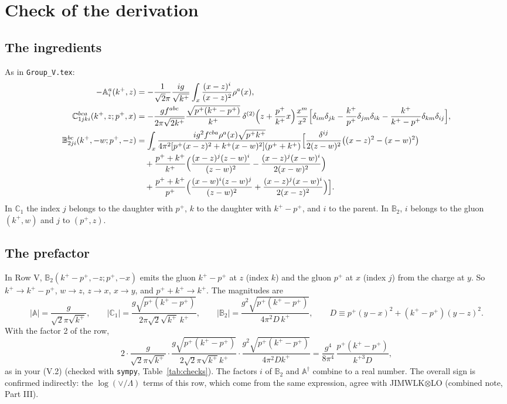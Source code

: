 \documentclass[10pt]{article}
\numberwithin{equation}{section}
\def\mf#1{\mathbb{#1}}
\begin{document}
\section{Check of the derivation}\label{sec:check}
\subsection{The ingredients}
As in \texttt{Group\_V.tex}:
\begin{align}
-\mf A^a_i(k^+,z)&=-\frac{1}{\sqrt2\pi}\frac{ig}{\sqrt{k^+}}\int_x\frac{(x-z)^i}{(x-z)^2}\rho^a(x),\\
\mf C^{bca}_{1jki}(k^+,z;p^+,x)&=-\frac{gf^{abc}}{2\pi\sqrt{2k^+}}\frac{\sqrt{p^+(k^+-p^+)}}{k^+}\,\delta^{(2)}\Big(z+\frac{p^+}{k^+}x\Big)\frac{x^m}{x^2}\Big[\delta_{im}\delta_{jk}-\frac{k^+}{p^+}\delta_{jm}\delta_{ik}-\frac{k^+}{k^+-p^+}\delta_{km}\delta_{ij}\Big],\\
\mf B^{bc}_{2ji}(k^+,-w;p^+,-z)&=\int_x\frac{ig^2f^{cba}\rho^a(x)\sqrt{p^+k^+}}{4\pi^2[p^+(x-z)^2+k^+(x-w)^2](p^++k^+)}\Big[\frac{\delta^{ij}}{2(z-w)^2}\big((x-z)^2-(x-w)^2\big)\notag\\
&\quad+\frac{p^++k^+}{k^+}\Big(\frac{(x-z)^j(z-w)^i}{(z-w)^2}-\frac{(x-z)^j(x-w)^i}{2(x-w)^2}\Big)\notag\\
&\quad+\frac{p^++k^+}{p^+}\Big(\frac{(x-w)^i(z-w)^j}{(z-w)^2}+\frac{(x-z)^j(x-w)^i}{2(x-z)^2}\Big)\Big].
\end{align}
In $\mf C_1$ the index $j$ belongs to the daughter with $p^+$, $k$ to the daughter with $k^+-p^+$, and $i$ to the parent. In $\mf B_2$, $i$ belongs to the gluon $(k^+,w)$ and $j$ to $(p^+,z)$.

\subsection{The prefactor}
In Row V, $\mf B_2(k^+-p^+,-z;p^+,-x)$ emits the gluon $k^+-p^+$ at $z$ (index $k$) and the gluon $p^+$ at $x$ (index $j$) from the charge at $y$. So $k^+\to k^+-p^+$, $w\to z$, $z\to x$, $x\to y$, and $p^++k^+\to k^+$. The magnitudes are
\begin{equation}
|\mf A|=\frac{g}{\sqrt2\pi\sqrt{k^+}},\qquad |\mf C_1|=\frac{g\sqrt{p^+(k^+-p^+)}}{2\pi\sqrt2\sqrt{k^+}\,k^+},\qquad |\mf B_2|=\frac{g^2\sqrt{p^+(k^+-p^+)}}{4\pi^2D\,k^+},\qquad D\equiv p^+(y-x)^2+(k^+-p^+)(y-z)^2.
\end{equation}
With the factor 2 of the row,
\begin{equation}
2\cdot\frac{g}{\sqrt2\pi\sqrt{k^+}}\cdot\frac{g\sqrt{p^+(k^+-p^+)}}{2\sqrt2\pi\sqrt{k^+}k^+}\cdot\frac{g^2\sqrt{p^+(k^+-p^+)}}{4\pi^2Dk^+}=\frac{g^4}{8\pi^4}\,\frac{p^+(k^+-p^+)}{k^{+3}D},
\end{equation}
as in your (V.2) (checked with \texttt{sympy}, Table~\ref{tab:checks}). The factors $i$ of $\mf B_2$ and $\mf A^\dagger$ combine to a real number. The overall sign is confirmed indirectly: the $\log(\vee/\Lambda)$ terms of this row, which come from the same expression, agree with JIMWLK$\otimes$LO (combined note, Part III).
\end{document}
